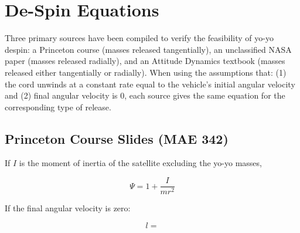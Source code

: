 \section{De-Spin Equations} \label{section:despin-appendix}
Three primary sources have been compiled to verify the feasibility of yo-yo despin: a Princeton course \cite{princeton-course} (masses released tangentially), an unclassified NASA paper \cite{eom-despin-dtic} (masses released radially), and an Attitude Dynamics textbook \cite{curtis-orbital-mech} (masses released either tangentially or radially). When using the assumptions that: (1) the cord unwinds at a constant rate equal to the vehicle’s initial angular velocity and (2) final angular velocity is 0, each source gives the same equation for the corresponding type of release.

\subsection{Princeton Course Slides (MAE 342)}

If \(I\) is the moment of inertia of the satellite excluding the yo-yo masses,

\[ \Psi = 1 + \frac{I}{mr^2} \]

If the final angular velocity is zero:

\[ l =  \]